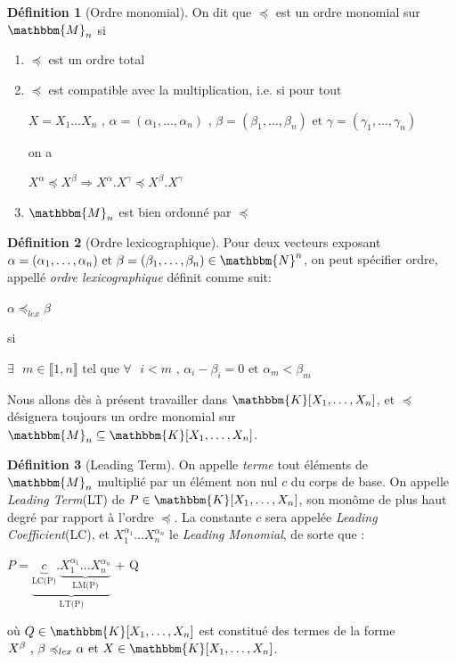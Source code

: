 \documentclass[12pt]{article}
\theoremstyle{remark}\newtheorem{note}{Note}
\theoremstyle{remark}\newtheorem{nota}{Notation}
\newcommand{\M}{\mathbbm{M}}
\newcommand{\N}{\mathbbm{N}}
\newcommand{\K}{\mathbbm{K}}
\newcommand{\ord}{\preccurlyeq}
\theoremstyle{definition}
\newtheorem{definition}{Définition}
\begin{document}
\begin{definition}[Ordre monomial]
On dit que $\ord$ est un ordre monomial sur $\M_n$ si 
	\begin{enumerate}
		\item $\ord$ est un ordre total
		\item $\ord$ est compatible avec la multiplication, i.e. si pour tout
		\begin{center} $X=X_1\ldots X_n  \text{ , } \alpha=(\alpha_1,\ldots, \alpha_n) \text{ , } \beta=(\beta_1,\ldots, \beta_n) \text{ et } \gamma=(\gamma_1,\ldots, \gamma_n)$\end{center}
on a 
		\begin{center}$X^{\alpha} \ord X^{\beta }\Rightarrow X^{\alpha}.X^{\gamma} \ord X^{\beta}.X^{\gamma}$\end{center}
		\item $\M_n$ est bien ordonné par $\ord$
	\end{enumerate}
\end{definition}

\begin{definition}[Ordre lexicographique]
Pour deux vecteurs exposant $\alpha=(\alpha_1,\ldots, \alpha_n) \text{ et } \beta=(\beta_1,\ldots, \beta_n) \in\N^n$, on peut spécifier ordre, appellé \textit{ordre lexicographique} définit comme suit:
	\begin{center} $\alpha\ord_{lex} \beta $\end{center}
	\begin{center} si \end{center}
	\begin{center} $\exists \text{ } m\in\llbracket 1,n \rrbracket \text{ tel que } \forall \text{ } i<m \text{ , } \alpha_i-\beta_i=0  \text{ et } \alpha_m < \beta_m$ \end{center}
\end{definition}

Nous allons dès à présent travailler dans $\K[X_1, \ldots, X_n]$, et $\ord$ désignera toujours un ordre monomial sur $\M_n\subseteq \K[X_1, \ldots, X_n]$.

\begin{definition}[Leading Term]
On appelle \textit{terme} tout éléments de $\M_n$ multiplié par un élément non nul $c$ du corps de base. \newline
On appelle \textit{Leading Term}(LT) de $P\in \K[X_1, \ldots, X_n]$, son monôme de plus haut degré par rapport à l'ordre $\ord$. \newline
La constante $c$ sera appelée \textit{Leading Coefficient}(LC), et $X_1^{\alpha_1}\ldots X_n^{\alpha_n}$ le \textit{Leading Monomial}, de sorte que :
\begin{center} $P = \underbrace{\underbrace{c}_\textrm{LC(P)}.\underbrace{X_1^{\alpha_1}\ldots X_n^{\alpha_n}}_\textrm{LM(P)}}_\textrm{LT(P)}$  + Q \end{center}
où $Q\in \K[X_1, \ldots, X_n]$ est constitué des termes de la forme $X^\beta \text{ , } \beta \ord_{lex} \alpha \text{ et } X \in\K[X_1, \ldots, X_n]$.
\end{definition}
\end{document}
